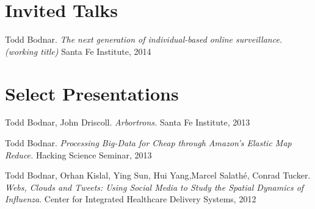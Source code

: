 \documentclass[margin,line]{res}
\begin{document}
\begin{resume}
\section{\sc Invited Talks}
\begin{etaremune}[start=1,leftmargin=13pt]
\item Todd Bodnar. \textit{The next generation of individual-based online surveillance.(working title)} Santa Fe Institute, 2014
\end{etaremune}  

\section{\sc Select Presentations}
\begin{etaremune}[start=3,leftmargin=13pt]
\item Todd Bodnar, John Driscoll. \textit{Arbortrons.} Santa Fe Institute, 2013
\item Todd Bodnar. \textit{Processing Big-Data for Cheap through Amazon's Elastic Map Reduce.} Hacking Science Seminar, 2013
\item Todd Bodnar, Orhan Kislal, Ying Sun, Hui Yang,Marcel Salath\'e, Conrad 
Tucker. \textit{Webs, Clouds and Tweets: Using Social Media to Study the Spatial Dynamics of Influenza}. Center for Integrated Healthcare Delivery Systems, 2012 
\end{etaremune}


%


\end{resume}
\end{document}
